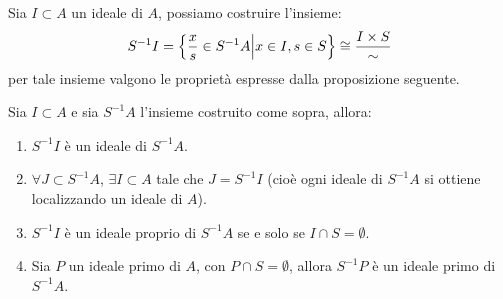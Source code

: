 \documentclass[11pt]{scrartcl}
\begin{document}
\begin{remark}
    [Ideali di $S^{-1}A$]
    Sia $I \subset A$ un ideale di $A$, possiamo costruire l'insieme:
    \[ S^{-1}I = \left\{\frac{x}{s} \in S^{-1}A \middle| x \in I, s \in S \right\} \cong \frac{I \times S}{\sim}
        \]
    per tale insieme valgono le proprietà espresse dalla proposizione seguente.
\end{remark}

\begin{proposition}
    [Ideali di $S^{-1}A$]
    Sia $I \subset A$ e sia $S^{-1}A$ l'insieme costruito come sopra, allora:
    \begin{enumerate}[(1)]
        \item $S^{-1}I$ è un ideale di $S^{-1}A$.
        \item $\forall J \subset S^{-1}A$, $\exists I \subset A$ tale che $J = S^{-1}I$ (cioè ogni ideale di $S^{-1}A$ si ottiene localizzando un ideale di $A$).
        \item $S^{-1}I$ è un ideale proprio di $S^{-1}A$ se e solo se $I \cap S = \emptyset$.
        \item Sia $P$ un ideale primo di $A$, con $P \cap S = \emptyset$, allora $S^{-1}P$ è un ideale primo di $S^{-1}A$.
    \end{enumerate}
\end{proposition}
\end{document}
